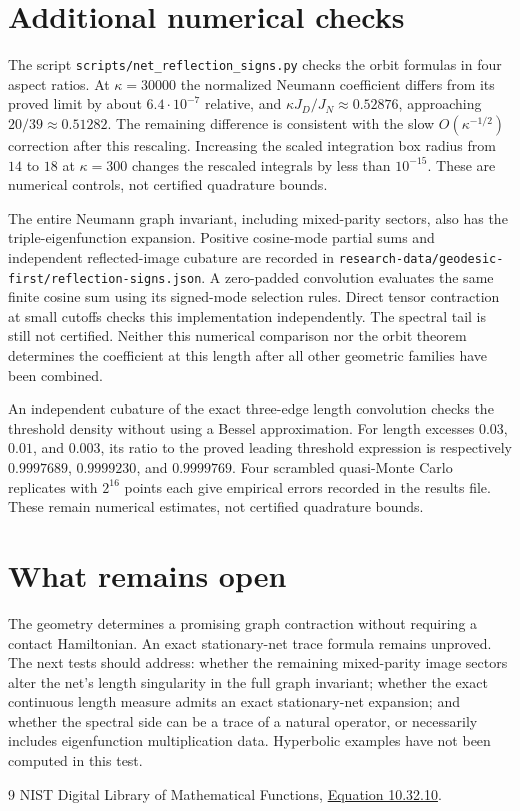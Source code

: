 \documentclass[11pt]{article}
\begin{document}
\section{Additional numerical checks}
The script \texttt{scripts/net\_reflection\_signs.py} checks the orbit
formulas in four aspect ratios. At $\kappa=30000$ the normalized
Neumann coefficient differs from its proved limit by about
$6.4\cdot10^{-7}$ relative, and
$\kappa J_D/J_N\approx0.52876$, approaching $20/39\approx0.51282$.
The remaining difference is consistent with the slow
$O(\kappa^{-1/2})$ correction after this rescaling.
Increasing the scaled integration box radius from $14$ to $18$ at
$\kappa=300$ changes the rescaled integrals by less than $10^{-15}$.
These are numerical controls, not certified quadrature bounds.

The entire Neumann graph invariant, including mixed-parity sectors,
also has the triple-eigenfunction expansion. Positive cosine-mode
partial sums and independent reflected-image cubature are recorded
in \texttt{research-data/geodesic-first/reflection-signs.json}.
A zero-padded convolution evaluates the same finite cosine sum using
its signed-mode selection rules. Direct tensor contraction at small
cutoffs checks this implementation independently. The spectral tail
is still not certified. Neither this numerical comparison nor the
orbit theorem determines the coefficient at this length after all
other geometric families have been combined.

An independent cubature of the exact three-edge length convolution
checks the threshold density without using a Bessel approximation.
For length excesses $0.03$, $0.01$, and $0.003$, its ratio to the
proved leading threshold expression is respectively
$0.9997689$, $0.9999230$, and $0.9999769$.
Four scrambled quasi-Monte Carlo replicates with $2^{16}$ points each
give empirical errors recorded in the results file. These remain
numerical estimates, not certified quadrature bounds.

\section{What remains open}
The geometry determines a promising graph contraction without
requiring a contact Hamiltonian. An exact stationary-net trace
formula remains unproved. The next tests should address:
whether the remaining mixed-parity image sectors alter the net's
length singularity in the full graph invariant;
whether the exact continuous length measure admits an exact
stationary-net expansion; and whether the spectral
side can be a trace of a natural operator, or necessarily includes
eigenfunction multiplication data. Hyperbolic examples have not
been computed in this test.

\begin{thebibliography}{9}
 NIST Digital Library of Mathematical Functions,
\href{https://dlmf.nist.gov/10.32.E10}{Equation 10.32.10}.
\end{thebibliography}
\end{document}
